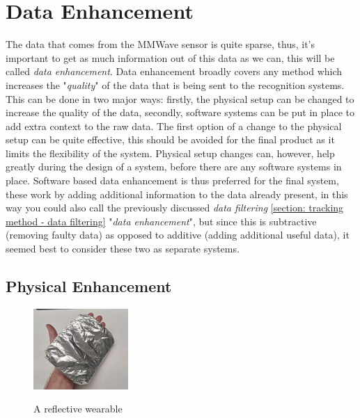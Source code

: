 
\section{Data Enhancement}
\label{section: tracking method - data enhancement}


The data that comes from the MMWave sensor is quite sparse, thus, it's important to get as much information out of this data as we can, this will be called \textit{data enhancement}.
Data enhancement broadly covers any method which increases the "\textit{quality}" of the data that is being sent to the recognition systems.
This can be done in two major ways: firstly, the physical setup can be changed to increase the quality of the data, secondly, software systems can be put in place to add extra context to the raw data.
The first option of a change to the physical setup can be quite effective, this should be avoided for the final product as it limits the flexibility of the system.
Physical setup changes can, however, help greatly during the design of a system, before there are any software systems in place.
Software based data enhancement is thus preferred for the final system, these work by adding additional information to the data already present, in this way you could also call the previously discussed \textit{data filtering} \ref{section: tracking method - data filtering} "\textit{data enhancement}", but since this is subtractive (removing faulty data) as opposed to additive (adding additional useful data), it seemed best to consider these two as separate systems.

\subsection{Physical Enhancement}
\label{sub-section: tracking method - data enhancement - physical enhancement}

\begin{figure}
    \caption{A reflective wearable}
    \centering
    \includegraphics[width=0.32\textwidth]{figures/reflective wearable.png}
    \label{fig: reflective glove wearable}
\end{figure}

